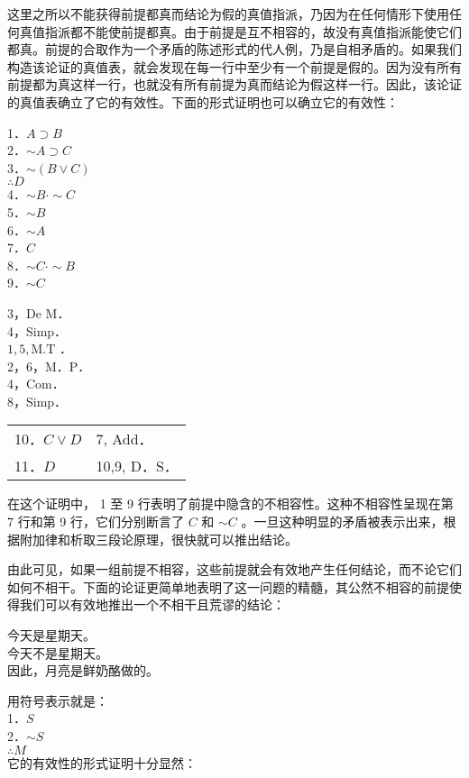 这里之所以不能获得前提都真而结论为假的真值指派，乃因为在任何情形下使用任何真值指派都不能使前提都真。由于前提是互不相容的，故没有真值指派能使它们都真。前提的合取作为一个矛盾的陈述形式的代人例，乃是自相矛盾的。如果我们构造该论证的真值表，就会发现在每一行中至少有一个前提是假的。因为没有所有前提都为真这样一行，也就没有所有前提为真而结论为假这样一行。因此，该论证的真值表确立了它的有效性。下面的形式证明也可以确立它的有效性：

1．$A \supset B$\\
2．$\sim A \supset C$\\
3．$\sim(B \vee C)$\\
$\therefore D$\\
4．$\sim B \cdot \sim C$\\
5．$\sim B$\\
6．$\sim A$\\
7．$C$\\
8．$\sim C \cdot \sim B$\\
9．$\sim C$

3，De M．\\
4，Simp．\\
$1,5, \mathrm{M} . \mathrm{T}$ ．\\
2，6，M．P．\\
4，Com．\\
8，Simp．

\begin{center}
\begin{tabular}{ll}
10．$C \vee D$ & 7, Add． \\
11．$D$ & 10,9, D．S． \\
\end{tabular}
\end{center}

在这个证明中， 1 至 9 行表明了前提中隐含的不相容性。这种不相容性呈现在第 7 行和第 9 行，它们分别断言了 $C$ 和 $\sim C$ 。一旦这种明显的矛盾被表示出来，根据附加律和析取三段论原理，很快就可以推出结论。

由此可见，如果一组前提不相容，这些前提就会有效地产生任何结论，而不论它们如何不相干。下面的论证更简单地表明了这一问题的精髓，其公然不相容的前提使得我们可以有效地推出一个不相干且荒谬的结论：

今天是星期天。\\
今天不是星期天。\\
因此，月亮是鲜奶酪做的。

用符号表示就是：\\
1．$S$\\
2．$\sim S$\\
$\therefore M$\\
它的有效性的形式证明十分显然：

